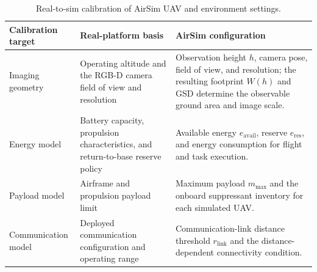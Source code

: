 \begin{table}[!t]
    \centering
    \caption{Real-to-sim calibration of AirSim UAV and environment settings.}
    \label{tab:real_to_sim_calibration}
    \footnotesize
    \setlength{\tabcolsep}{5pt}
    \renewcommand{\arraystretch}{1.25}
    \begin{tabularx}{\textwidth}{
        @{}
        >{\raggedright\arraybackslash}p{2.7cm}
        >{\raggedright\arraybackslash}p{4.4cm}
        >{\raggedright\arraybackslash}X
        @{}
    }
        \toprule
        \textbf{Calibration target} &
        \textbf{Real-platform basis} &
        \textbf{AirSim configuration} \\
        \midrule
        Imaging geometry &
        Operating altitude and the RGB-D camera field of view and resolution &
        Observation height $h$, camera pose, field of view, and resolution; the resulting footprint $W(h)$ and GSD determine the observable ground area and image scale. \\

        Energy model &
        Battery capacity, propulsion characteristics, and return-to-base reserve policy &
        Available energy $e_{\mathrm{avail}}$, reserve $e_{\mathrm{res}}$, and energy consumption for flight and task execution. \\

        Payload model &
        Airframe and propulsion payload limit &
        Maximum payload $m_{\max}$ and the onboard suppressant inventory for each simulated UAV. \\

        Communication model &
        Deployed communication configuration and operating range &
        Communication-link distance threshold $r_{\mathrm{link}}$ and the distance-dependent connectivity condition. \\
        \bottomrule
    \end{tabularx}
\end{table}
